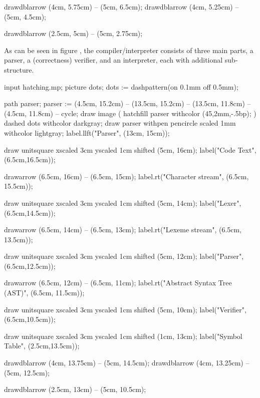 drawdblarrow (4cm, 5.75cm) -- (5cm, 6.5cm);
drawdblarrow (4cm, 5.25cm) -- (5cm, 4.5cm);

drawdblarrow (2.5cm, 5cm)  -- (5cm, 2.75cm);
\stopMPcode\egroup

As can be seen in figure , the compiler/interpreter 
consists of three main parts, a parser, a (correctness) verifier, and an 
interpreter, each with additional sub-structure. 

\startitemize[1]

\item {}

\bgroup\startMPcode
input hatching.mp;
picture dots; dots := dashpattern(on 0.1mm off 0.5mm);

path parser;
parser := (4.5cm, 15.2cm)  -- (13.5cm, 15.2cm) --
          (13.5cm, 11.8cm) -- (4.5cm, 11.8cm)  -- cycle;
draw image (
  hatchfill parser
    withcolor (45,2mm,-.5bp);
) dashed dots withcolor darkgray;
draw parser
  withpen pencircle scaled 1mm
  withcolor lightgray;
label.llft("Parser", (13cm, 15cm));

draw unitsquare xscaled 3cm yscaled 1cm shifted (5cm, 16cm);
label("Code Text", (6.5cm,16.5cm));

drawarrow (6.5cm, 16cm) -- (6.5cm, 15cm);
label.rt("Character stream", (6.5cm, 15.5cm));

draw unitsquare xscaled 3cm yscaled 1cm shifted (5cm, 14cm);
label("Lexer", (6.5cm,14.5cm));

drawarrow (6.5cm, 14cm) -- (6.5cm, 13cm);
label.rt("Lexeme stream", (6.5cm, 13.5cm));

draw unitsquare xscaled 3cm yscaled 1cm shifted (5cm, 12cm);
label("Parser", (6.5cm,12.5cm));

drawarrow (6.5cm, 12cm) -- (6.5cm, 11cm);
label.rt("Abstract Syntax Tree (AST)", (6.5cm, 11.5cm));

draw unitsquare xscaled 3cm yscaled 1cm shifted (5cm, 10cm);
label("Verifier", (6.5cm,10.5cm));

draw unitsquare xscaled 3cm yscaled 1cm shifted (1cm, 13cm);
label("Symbol Table", (2.5cm,13.5cm));

drawdblarrow (4cm, 13.75cm) -- (5cm, 14.5cm);
drawdblarrow (4cm, 13.25cm) -- (5cm, 12.5cm);

drawdblarrow (2.5cm, 13cm)  -- (5cm, 10.5cm);
\stopMPcode\egroup

